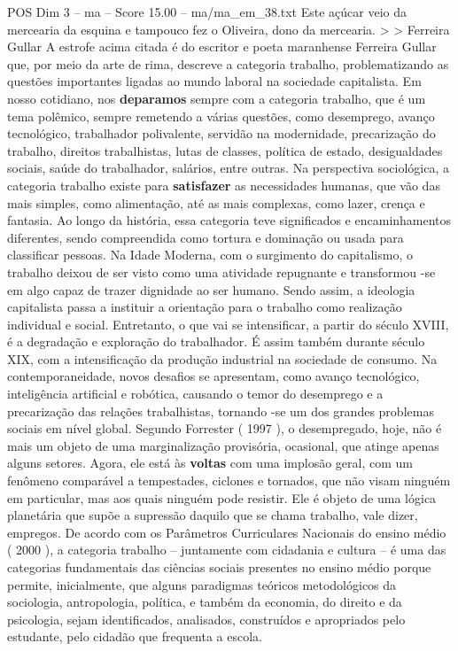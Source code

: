 \begin{textsample}{POS Dim 3 – ma – Score 15.00 – ma/ma\_em\_38.txt}
Este açúcar veio da mercearia da esquina e tampouco fez o Oliveira, dono da mercearia. > > Ferreira Gullar A estrofe acima citada é do escritor e poeta maranhense Ferreira Gullar que, por meio da arte de rima, descreve a categoria trabalho, problematizando as questões importantes ligadas ao mundo laboral na sociedade capitalista.
Em nosso cotidiano, nos \textbf{deparamos} sempre com a categoria trabalho, que é um tema polêmico, sempre remetendo a várias questões, como desemprego, avanço tecnológico, trabalhador polivalente, servidão na modernidade, precarização do trabalho, direitos trabalhistas, lutas de classes, política de estado, desigualdades sociais, saúde do trabalhador, salários, entre outras.
Na perspectiva sociológica, a categoria trabalho existe para \textbf{satisfazer} as necessidades humanas, que vão das mais simples, como alimentação, até as mais complexas, como lazer, crença e fantasia.
Ao longo da história, essa categoria teve significados e encaminhamentos diferentes, sendo compreendida como tortura e dominação ou usada para classificar pessoas.
Na Idade Moderna, com o surgimento do capitalismo, o trabalho deixou de ser visto como uma atividade repugnante e transformou -se em algo capaz de trazer dignidade ao ser humano.
Sendo assim, a ideologia capitalista passa a instituir a orientação para o trabalho como realização individual e social.
Entretanto, o que vai se intensificar, a partir do século XVIII, é a degradação e exploração do trabalhador.
É assim também durante século XIX, com a intensificação da produção industrial na sociedade de consumo.
Na contemporaneidade, novos desafios se apresentam, como avanço tecnológico, inteligência artificial e robótica, causando o temor do desemprego e a precarização das relações trabalhistas, tornando -se um dos grandes problemas sociais em nível global.
Segundo Forrester ( 1997 ), o desempregado, hoje, não é mais um objeto de uma marginalização provisória, ocasional, que atinge apenas alguns setores.
Agora, ele está às \textbf{voltas} com uma implosão geral, com um fenômeno comparável a tempestades, ciclones e tornados, que não visam ninguém em particular, mas aos quais ninguém pode resistir.
Ele é objeto de uma lógica planetária que supõe a supressão daquilo que se chama trabalho, vale dizer, empregos.
De acordo com os Parâmetros Curriculares Nacionais do ensino médio ( 2000 ), a categoria trabalho – juntamente com cidadania e cultura – é uma das categorias fundamentais das ciências sociais presentes no ensino médio porque permite, inicialmente, que alguns paradigmas teóricos metodológicos da sociologia, antropologia, política, e também da economia, do direito e da psicologia, sejam identificados, analisados, construídos e apropriados pelo estudante, pelo cidadão que frequenta a escola.

\end{textsample}
